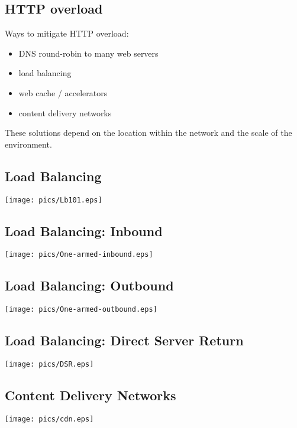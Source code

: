 \documentclass[xga]{xdvislides}
\begin{document}
\subsection{HTTP overload}
Ways to mitigate HTTP overload:

\begin{itemize}
	\item DNS round-robin to many web servers
	\item load balancing
	\item web cache / accelerators
	\item content delivery networks
\end{itemize}

These solutions depend on the location within the network and the scale of
the environment.

\subsection{Load Balancing}
\begin{center}
	\texttt{[image: pics/Lb101.eps]}
\end{center}

\subsection{Load Balancing: Inbound}
\begin{center}
	\texttt{[image: pics/One-armed-inbound.eps]}
\end{center}

\subsection{Load Balancing: Outbound}
\begin{center}
	\texttt{[image: pics/One-armed-outbound.eps]}
\end{center}

\subsection{Load Balancing: Direct Server Return}
\begin{center}
	\texttt{[image: pics/DSR.eps]}
\end{center}

\subsection{Content Delivery Networks}
\begin{center}
	\texttt{[image: pics/cdn.eps]}
\end{center}
\end{document}
